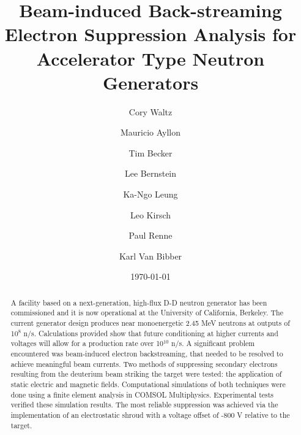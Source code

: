 \documentclass[aps,prstab,twocolumn,superscriptaddress]{revtex4-1}
\begin{document}

\title{Beam-induced Back-streaming Electron Suppression Analysis for Accelerator Type Neutron Generators}

\author{Cory Waltz}
\author{Mauricio Ayllon}
\author{Tim Becker}
\author{Lee Bernstein}
\author{Ka-Ngo Leung}
\author{Leo Kirsch}
\author{Paul Renne}
\author{Karl Van Bibber}

\date{\today}

\begin{abstract}
A facility based on a next-generation, high-flux D-D neutron generator has been commissioned and it is now operational at the University of California, Berkeley. The current generator design produces near monoenergetic 2.45 MeV neutrons at outputs of 10$^{8}$ n/s. Calculations provided show that future conditioning at higher currents and voltages will allow for a production rate over 10$^{10}$ n/s. A significant problem encountered was beam-induced electron backstreaming, that needed to be resolved to achieve meaningful beam currents. Two methods of suppressing secondary electrons resulting from the deuterium beam striking the target were tested: the application of static electric and magnetic fields. Computational simulations of both techniques were done using a finite element analysis in COMSOL Multiphysics\textsuperscript{\textregistered}. Experimental tests verified these simulation results. The most reliable suppression was achieved via the implementation of an electrostatic shroud with a voltage offset of -800 V relative to the target.   
\end{abstract}
\end{document}
